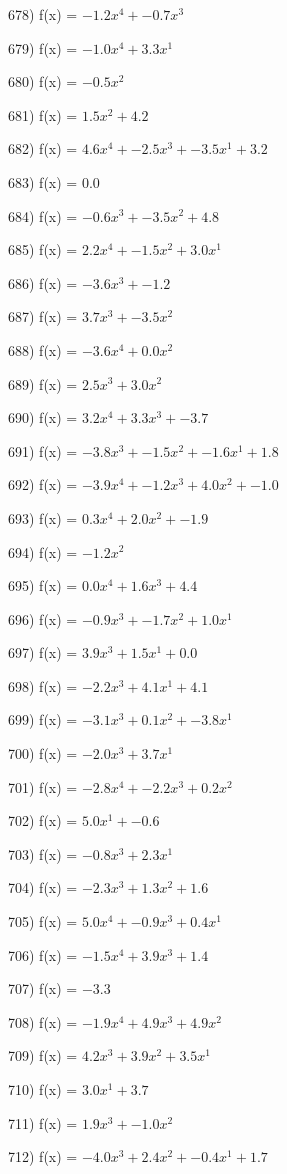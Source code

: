 \documentclass[10pt,a4paper]{article}
\begin{document}
678) f(x) = $-1.2x^4 + -0.7x^3$

679) f(x) = $-1.0x^4 + 3.3x^1$

680) f(x) = $-0.5x^2$

681) f(x) = $1.5x^2 + 4.2$

682) f(x) = $4.6x^4 + -2.5x^3 + -3.5x^1 + 3.2$

683) f(x) = $0.0$

684) f(x) = $-0.6x^3 + -3.5x^2 + 4.8$

685) f(x) = $2.2x^4 + -1.5x^2 + 3.0x^1$

686) f(x) = $-3.6x^3 + -1.2$

687) f(x) = $3.7x^3 + -3.5x^2$

688) f(x) = $-3.6x^4 + 0.0x^2$

689) f(x) = $2.5x^3 + 3.0x^2$

690) f(x) = $3.2x^4 + 3.3x^3 + -3.7$

691) f(x) = $-3.8x^3 + -1.5x^2 + -1.6x^1 + 1.8$

692) f(x) = $-3.9x^4 + -1.2x^3 + 4.0x^2 + -1.0$

693) f(x) = $0.3x^4 + 2.0x^2 + -1.9$

694) f(x) = $-1.2x^2$

695) f(x) = $0.0x^4 + 1.6x^3 + 4.4$

696) f(x) = $-0.9x^3 + -1.7x^2 + 1.0x^1$

697) f(x) = $3.9x^3 + 1.5x^1 + 0.0$

698) f(x) = $-2.2x^3 + 4.1x^1 + 4.1$

699) f(x) = $-3.1x^3 + 0.1x^2 + -3.8x^1$

700) f(x) = $-2.0x^3 + 3.7x^1$

701) f(x) = $-2.8x^4 + -2.2x^3 + 0.2x^2$

702) f(x) = $5.0x^1 + -0.6$

703) f(x) = $-0.8x^3 + 2.3x^1$

704) f(x) = $-2.3x^3 + 1.3x^2 + 1.6$

705) f(x) = $5.0x^4 + -0.9x^3 + 0.4x^1$

706) f(x) = $-1.5x^4 + 3.9x^3 + 1.4$

707) f(x) = $-3.3$

708) f(x) = $-1.9x^4 + 4.9x^3 + 4.9x^2$

709) f(x) = $4.2x^3 + 3.9x^2 + 3.5x^1$

710) f(x) = $3.0x^1 + 3.7$

711) f(x) = $1.9x^3 + -1.0x^2$

712) f(x) = $-4.0x^3 + 2.4x^2 + -0.4x^1 + 1.7$
\end{document}
